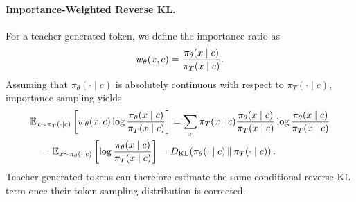 \paragraph{Importance-Weighted Reverse KL.}
For a teacher-generated token, we define the importance ratio as
\begin{equation}
    \setlength\abovedisplayskip{0.0pt}
    \setlength\belowdisplayskip{0.0pt}
    w_\theta(x,c)
    =
    \frac{\pi_\theta(x\mid c)}{\pi_T(x\mid c)}.
    \label{eq:teacher_importance_ratio}
\end{equation}
Assuming that $\pi_\theta(\cdot\mid c)$ is absolutely continuous with respect to $\pi_T(\cdot\mid c)$, importance sampling yields
\begin{equation}
    \setlength\abovedisplayskip{1.3pt}
    \setlength\belowdisplayskip{1.3pt}
\begin{split}
    &\mathbb{E}_{x\sim\pi_T(\cdot\mid c)}
    \left[
        w_\theta(x,c)
        \log\frac{\pi_\theta(x\mid c)}{\pi_T(x\mid c)}
    \right] =
    \sum_x \pi_T(x\mid c)
    \frac{\pi_\theta(x\mid c)}{\pi_T(x\mid c)}
    \log\frac{\pi_\theta(x\mid c)}{\pi_T(x\mid c)} \\
    &\quad=
    \mathbb{E}_{x\sim\pi_\theta(\cdot\mid c)}
    \left[
        \log\frac{\pi_\theta(x\mid c)}{\pi_T(x\mid c)}
    \right]
    =
    D_{\mathrm{KL}}\!\left(
        \pi_\theta(\cdot\mid c)
        \,\|\,
        \pi_T(\cdot\mid c)
    \right).
\end{split}
    \label{eq:importance_weighted_reverse_kl}
\end{equation}
Teacher-generated tokens can therefore estimate the same conditional reverse-KL term once their token-sampling distribution is corrected.


\vspace{-0.5em}
